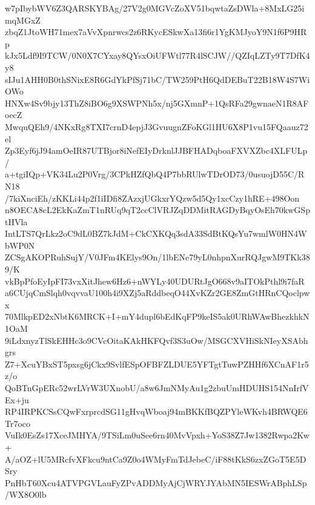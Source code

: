 w7pIbybWV6Z3QARSKYBAg/27V2g0MGVcZoXV51bqwtaZsDWla+8MxLG25imqMGxZ
zbqZ1JtoWH71mex7aVvXpnrwcs2z6RKycESkwXa13fi6r1YgKMJyoY9N1f6P9HRp
kJx5Ldf9I9TCW/0N0X7CYxay8QYsxOiUFWtl77R4lSCJW//QZIqLZTy9T7DfK4y8
sIJu1AHH0B0thSNixE8R6GdYkPfSj71bC/TW259PtH6QdDEBuT22B18W4S7WiOWo
HNXw4Sv9bjy13ThZ8iBO6g9XSWPNh5x/nj5GXmnP+1QsRFa29gwnaeN1R8AFoecZ
MwquQEh9/4NKxRg8TXI7crnD4epjJ3GvuugnZFoKGl1HU6X8P1vu15FQaauz72el
Zp3Eyf6jJ94amOeIR87UTBjor8iNefEIyDrknlJJBFHADqboaFXVXZbc4XLFULp/
a+tgiIQp+VK34Lu2P0Vrg/3CPkHZfQbQ4P7bbRUlwTDrOD73/0usuojD55C/RN18
/7kiXnciEh/zKKLi44p2f1iIDfi8ZAzxjUGkxrYQzw5d5Qy1xcCzy1hRE+498Oon
n8OECA8cL2EkKaZmT1nRUq9qT2ccClVRJZqDDMitRAGDyBqyOsEh70kwGSptHVla
IntLTS7QrLkz2oC9dL0BZ7kJdM+CkCXKQq3sdA33SdBtKQsYu7wmlW0HN4WbWP0N
ZCSgAKOPRuhSujY/V0JFm4KElys9On/1lbENe79yL0nhpnXurRQJgwM9TKk389/K
vkBpPfoEyIpFI73vxXitJhew6Hz6+nWYLy40UDURtJgO668v9aITOkPthl9i7faR
a6CUjqCmSlqh0vqvvaU100h4i9XZj5aRddbeqO44XvKZr2GE8ZmGtHRnCQoclpwx
70MlkpED2xNbtK6MRCK+I+mY4dupl6bEdKqFP9keIS5ak0URhWAwBhezkhkN1OaM
9iLdxnyzTlSkEHHc3o9CVcOitaKAkHKFQvf3S3uOw/MSGCXVHiSkNIeyXSAbhgrs
Z7+XcuYBxST5pxsg6jCkx9SvlfESpOFBFZLDUE5YFTgtTuwPZHHf6XCnAF1r5z/o
QoBTnGpERc52wrLVrW3UXnobU/a8w6JmNMyAu1g2zbuUmHDUHS154NnIrfVEx+ju
RP4IRPKCSsCQwFxrprcdSG11gHvqWboaj94mBKKfBQZPYleWKvh4BRWQE6Tr7oco
VuIk0EsZs17XceJMHYA/9TSiLm0uSee6rn40MvVpxh+YoS38Z7Jw1382Rwpa2Kw+
A/aOZ+lU5MRcfvXFkcu9ntCa9Z0o4WMyFmTdJebeC/iF88tKkS6zxZGoT5E5DSry
PnHbT60Xcu4ATVPGVLauFyZPvADDMyAjCjWRYJYAbMN5IESWrABphLSp/WX8O0lb
